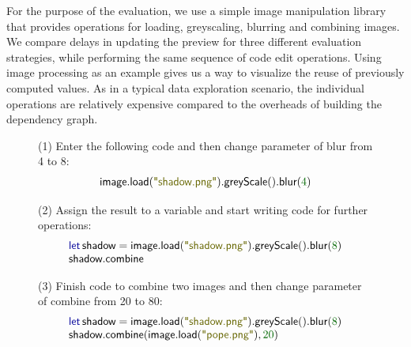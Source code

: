 \documentclass[english,submission]{programming}
\theoremstyle{plain}
\theoremstyle{definition}
\newcommand{\num}[1]{\textcolor{numclr}{#1}}
\newcommand{\str}[1]{\textnormal{\textcolor{strclr}{\sffamily "#1"}}}
\newcommand{\ident}[1]{\textnormal{\textcolor{idclr}{\sffamily #1}}}
\newcommand{\kvd}[1]{\textnormal{\textcolor{kvdclr}{\sffamily #1}}}
\begin{document}
For the purpose of the evaluation, we use a simple image manipulation library that provides
operations for loading, greyscaling, blurring and combining images. We compare delays in
updating the preview for three different evaluation strategies, while performing the same
sequence of code edit operations. Using image processing as an example gives us a way to
visualize the reuse of previously computed values. As in a typical data exploration scenario,
the individual operations are relatively expensive compared to the overheads of building the
dependency graph.


\begin{figure}
\raggedright
\vspace{-0.5em}
{\small\sffamily (1) Enter the following code and then change parameter of blur from 4 to 8:}
\vspace{-0.5em}
\begin{equation*}
\begin{array}{l}
\ident{image}.\ident{load}(\str{shadow.png}).\ident{greyScale}().\ident{blur}(\num{4})
\end{array}
\end{equation*}

{\small\sffamily (2) Assign the result to a variable and start writing code for further operations:}
\vspace{-0.5em}
\begin{equation*}
\begin{array}{l}
\kvd{let}\,\ident{shadow}=\ident{image}.\ident{load}(\str{shadow.png}).\ident{greyScale}().\ident{blur}(\num{8})\\
\ident{shadow}.\ident{combine}
\end{array}
\end{equation*}

{\small\sffamily (3) Finish code to combine two images and then change parameter of combine from 20 to 80:}
\vspace{-0.5em}
\begin{equation*}
\begin{array}{l}
\kvd{let}\,\ident{shadow}=\ident{image}.\ident{load}(\str{shadow.png}).\ident{greyScale}().\ident{blur}(\num{8})\\
\ident{shadow}.\ident{combine}(\ident{image}.\ident{load}(\str{pope.png}), \num{20})
\end{array}
\end{equation*}


\end{figure}
\end{document}
